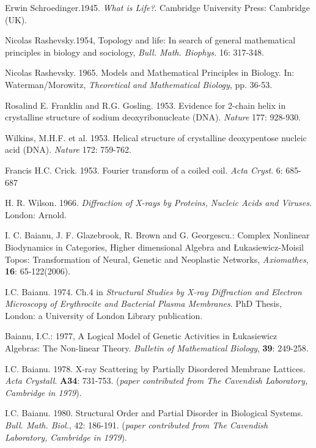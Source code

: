 \documentclass[12pt]{article}
\theoremstyle{plain}
\theoremstyle{definition}
\numberwithin{equation}{section}
\newcommand{\<}{{\langle}}
\begin{document}
\begin{thebibliography}{9}

Erwin Schroedinger.1945. \emph{What is Life?}. Cambridge University Press: Cambridge (UK).

Nicolas Rashevsky.1954, Topology and life: In search of general mathematical principles in
biology and sociology, \emph{Bull. Math. Biophys.} 16: 317-348.

Nicolas Rashevsky. 1965. Models and Mathematical Principles in Biology. In: Waterman/Morowitz, \emph{Theoretical and Mathematical Biology}, pp. 36-53.

Rosalind E. Franklin and R.G. Gosling. 1953. Evidence for 2-chain helix in crystalline structure
of sodium deoxyribonucleate (DNA). \emph{Nature} 177: 928-930.

Wilkins, M.H.F. et al. 1953. Helical structure of crystalline deoxypentose nucleic acid (DNA).
\emph{Nature} 172: 759-762.

Francis H.C. Crick. 1953. Fourier transform of a coiled coil. \emph{Acta Cryst}. 6: 685-687

H. R. Wilson. 1966. \emph{Diffraction of X-rays by Proteins, Nucleic Acids and Viruses}.
London: Arnold.

I. C. Baianu, J. F. Glazebrook, R. Brown and G. Georgescu.: Complex Nonlinear Biodynamics in Categories, Higher dimensional Algebra and \L{}ukasiewicz-Moisil Topos: Transformation of Neural, Genetic and Neoplastic Networks, \emph{Axiomathes}, \textbf{16}: 65-122(2006).

I.C. Baianu. 1974. Ch.4 in \emph{Structural Studies by X-ray Diffraction and Electron Microscopy of Erythrocite and Bacterial Plasma Membranes}. PhD Thesis, London: a University of London Library publication.

Baianu, I.C.: 1977, A Logical Model of Genetic Activities in \L ukasiewicz Algebras: The Non-linear Theory. \emph{Bulletin of Mathematical Biology}, \textbf{39}: 249-258.

I.C. Baianu. 1978. X-ray Scattering by Partially Disordered Membrane Lattices.
\emph{Acta Crystall}. \textbf{A34}: 731-753. (\emph{paper contributed from The Cavendish Laboratory, Cambridge in 1979}).

I.C. Baianu. 1980. Structural Order and Partial Disorder in Biological Systems. \emph{Bull. Math. Biol.}, 42: 186-191.
(\emph{paper contributed from The Cavendish Laboratory, Cambridge in 1979}).


\end{thebibliography}
\end{document}
